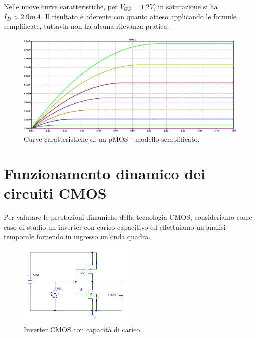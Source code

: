 Nelle nuove curve caratteristiche, per $V_{GS} = 1.2V$, in saturazione si ha $I_D \approx 2.9mA$.
Il risultato è aderente con quanto atteso applicando le formule semplificate, tuttavia non ha alcuna rilevanza pratica.

\begin{figure}[hbt!]
	\centering
	\includegraphics[width=1\textwidth]{figure/Sim_DCSweep_PMOS1_ModelloSemplificato(Chiaro).PNG}
	\caption{Curve caratteristiche di un pMOS - modello semplificato.}
	\label{fig:curveCaratteristicheSemplificate}
\end{figure}


\section{Funzionamento dinamico dei circuiti CMOS}
\label{sec:funzionamentoDinamicoCMOS}

Per valutare le prestazioni dinamiche della tecnologia CMOS, consideriamo come caso di studio un inverter con carico capacitivo ed effettuiamo un'analisi temporale fornendo in ingresso un'onda quadra.

\begin{figure}[hbt!]
	\centering
	\includegraphics[width=0.5\textwidth]{figure/Sch_InverterCMOS.PNG}
	\caption{Inverter CMOS con capacità di carico.}
	\label{fig:fig_sch_inverterCMOS}
\end{figure}

